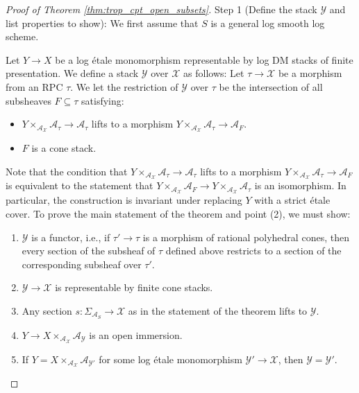 \documentclass[11pt]{amsart}
\theoremstyle{definition}
\theoremstyle{remark}
\begin{document}
\begin{proof}[Proof of Theorem \ref{thm:trop_cpt_open_subsets}]
	Step 1 (Define the stack $\mathcal{Y}$ and list properties to show): We first assume that $S$ is a general log smooth log scheme.

	Let $Y\to X$ be a log étale monomorphism representable by log DM stacks of finite presentation.
	We define a stack $\mathcal{Y}$ over $\mathcal{X}$ as follows:
	Let $\tau\to \mathcal{X}$ be a morphism from an RPC $\tau$. We let the restriction of $\mathcal{Y}$ over $\tau$
	be the intersection of all subsheaves $F\subseteq \tau$ satisfying:
	\begin{itemize}
		\item $Y\times_{\mathcal{A}_{\mathcal{X}}}\mathcal{A}_{\tau}\to \mathcal{A}_{\tau}$ lifts to a morphism $Y\times_{\mathcal{A}_{\mathcal{X}}}\mathcal{A}_{\tau}\to \mathcal{A}_{F}$.
		\item $F$ is a cone stack.
	\end{itemize}
	Note that the condition that $Y\times_{\mathcal{A}_{\mathcal{X}}}\mathcal{A}_{\tau}\to \mathcal{A}_{\tau}$ lifts to a morphism $Y\times_{\mathcal{A}_{\mathcal{X}}}\mathcal{A}_{\tau}\to \mathcal{A}_{F}$
	is equivalent to the statement that $Y\times_{\mathcal{A}_{\mathcal{X}}}\mathcal{A}_F\to Y\times_{\mathcal{A}_{\mathcal{X}}}\mathcal{A}_{\tau}$
	is an isomorphism. In particular, the construction is invariant under replacing $Y$ with a strict étale cover.
	To prove the main statement of the theorem and point (2), we must show:
	\begin{enumerate}
		\item $\mathcal{Y}$ is a functor, i.e., if $\tau'\to \tau$ is a morphism of rational polyhedral cones, then
			every section of the subsheaf of $\tau$ defined above restricts to a section of the corresponding subsheaf over $\tau'$.
		\item $\mathcal{Y}\to \mathcal{X}$ is representable by finite cone stacks.
		\item Any section $s:\Sigma_{\mathcal{A}_S}\to \mathcal{X}$ as in the statement of the theorem lifts to $\mathcal{Y}$.
		\item $Y\to X\times_{\mathcal{A}_{\mathcal{X}}}\mathcal{A}_{\mathcal{Y}}$ is an open immersion.
		\item If $Y=X\times_{\mathcal{A}_{\mathcal{X}}}\mathcal{A}_{\mathcal{Y}'}$ for some log étale monomorphism $\mathcal{Y}'\to \mathcal{X}$,
			then $\mathcal{Y}=\mathcal{Y}'$.
	\end{enumerate}


\end{proof}
\end{document}

